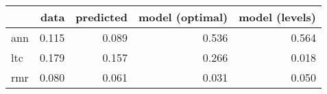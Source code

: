 \begin{tabular}{lrrrr}
\toprule
{} &   data &  predicted &  model (optimal) &  model (levels) \\
\midrule
ann &  0.115 &      0.089 &            0.536 &           0.564 \\
ltc &  0.179 &      0.157 &            0.266 &           0.018 \\
rmr &  0.080 &      0.061 &            0.031 &           0.050 \\
\bottomrule
\end{tabular}
